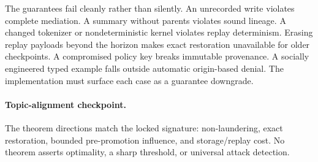 The guarantees fail cleanly rather than silently. An unrecorded write violates complete mediation. A summary without parents violates sound lineage. A changed tokenizer or nondeterministic kernel violates replay determinism. Erasing replay payloads beyond the horizon makes exact restoration unavailable for older checkpoints. A compromised policy key breaks immutable provenance. A socially engineered typed example falls outside automatic origin-based denial. The implementation must surface each case as a guarantee downgrade.

\paragraph{Topic-alignment checkpoint.} The theorem directions match the locked signature: non-laundering, exact restoration, bounded pre-promotion influence, and storage/replay cost. No theorem asserts optimality, a sharp threshold, or universal attack detection.
